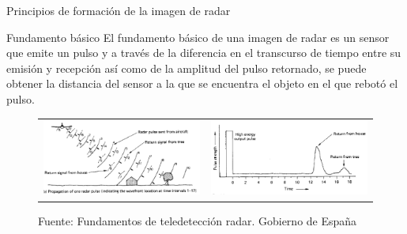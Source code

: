 \begin{frame}{Principios de formación de la imagen de radar}
  \begin{block}{Fundamento básico}
    El fundamento básico de una imagen de radar es un sensor que emite un pulso y a través de la diferencia en el transcurso de tiempo entre su emisión y recepción así como de la amplitud del pulso retornado, se puede obtener la distancia del sensor a la que se encuentra el objeto en el que rebotó el pulso.
  \end{block}

  \begin{figure}
    \begin{center}
      \begin{tabular}[c]{ll}
        \includegraphics[scale=0.3]{img/section_03/principio_01} &
        \includegraphics[scale=0.3]{img/section_03/principio_02} \\
      \end{tabular}
    \end{center}
    \caption{Fuente: Fundamentos de teledetección radar. Gobierno de España}
    \label{fig:resolucion_temporal}
  \end{figure}
\end{frame}

